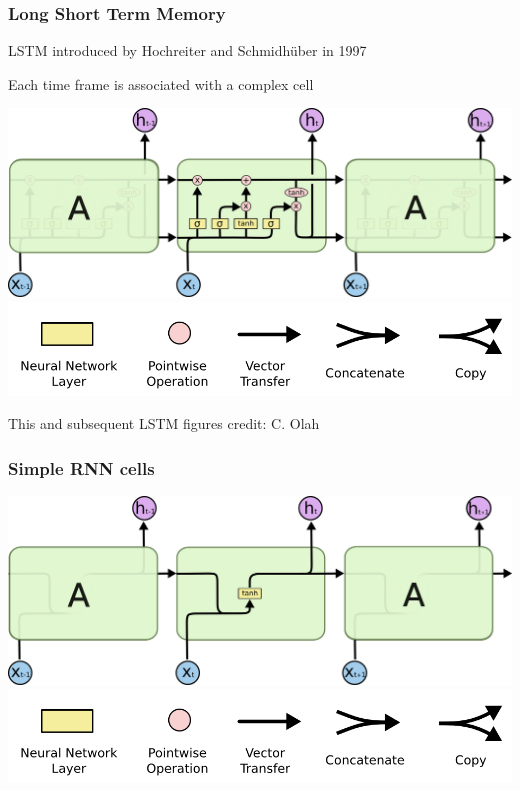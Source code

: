 \documentclass[xcolor=dvipsnames]{beamer}
\begin{document}
\begin{frame}
  \frametitle{Long Short Term Memory}

\bi
  \item LSTM introduced by Hochreiter and Schmidh\"uber in 1997
\item Each time frame is associated with a complex cell

\includegraphics[width=.8\textwidth]{olah-lstm/LSTM3-chain}\\
\includegraphics[width=.5\textwidth]{olah-lstm/LSTM2-notation}

\item This and subsequent LSTM figures credit: C. Olah
\ei

\end{frame}

\begin{frame}
  \frametitle{Simple RNN cells}
\includegraphics[width=.8\textwidth]{olah-lstm/LSTM3-SimpleRNN}\\
\includegraphics[width=.5\textwidth]{olah-lstm/LSTM2-notation}
\end{frame}
\end{document}
